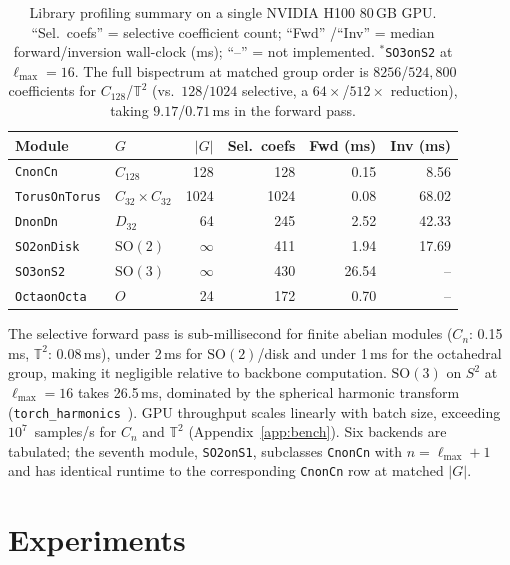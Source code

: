 \documentclass{article}
\theoremstyle{definition}
\theoremstyle{remark}
\newcommand{\SO}{\mathrm{SO}}
\theoremstyle{definition}
\begin{document}
\begin{table}[t]
  \centering
  \caption{Library profiling summary on a single NVIDIA H100 80\,GB GPU.
    ``Sel.\ coefs'' = selective coefficient count; ``Fwd'' /``Inv'' =
    median forward/inversion wall-clock (ms); ``--'' = not implemented.
    $^*$\texttt{SO3onS2} at $\ell_{\max}{=}16$. The full bispectrum at
    matched group order is $8256$/$524{,}800$ coefficients for
    $C_{128}$/$\mathbb{T}^2$ (vs.\ $128$/$1024$ selective, a
    $64\times$/$512\times$ reduction), taking $9.17$/$0.71$\,ms in
    the forward pass.}
  \label{tab:benchmarks}
  \small
  \setlength{\tabcolsep}{4pt}
  \begin{tabular}{llrrrr}
    \toprule
    Module & $G$ & $|G|$ & Sel.\ coefs & Fwd (ms) & Inv (ms) \\
    \midrule
    \texttt{CnonCn} & $C_{128}$ & 128 & 128 & 0.15 & 8.56 \\
    \texttt{TorusOnTorus} & $C_{32}{\times}C_{32}$ & 1024 & 1024 & 0.08 & 68.02 \\
    \texttt{DnonDn} & $D_{32}$ & 64 & 245 & 2.52 & 42.33 \\
    \texttt{SO2onDisk} & $\mathrm{SO}(2)$ & $\infty$ & 411 & 1.94 & 17.69 \\
    \texttt{SO3onS2}\rlap{$^*$} & $\mathrm{SO}(3)$ & $\infty$ & 430 & 26.54 & -- \\
    \texttt{OctaonOcta} & $O$ & 24 & 172 & 0.70 & -- \\
    \bottomrule
  \end{tabular}
\end{table}

The selective forward pass is sub-millisecond for finite abelian
modules ($C_n$: 0.15\,ms, $\mathbb{T}^2$: 0.08\,ms), under 2\,ms for
$\SO(2)$/disk and under 1\,ms for the octahedral group, making it
negligible relative to backbone computation. $\SO(3)$ on $S^2$ at
$\ell_{\max}{=}16$ takes 26.5\,ms, dominated by the spherical
harmonic transform
(\texttt{torch\_harmonics}~\citep{bonev2023spherical}). GPU throughput
scales linearly with batch size, exceeding $10^7$~samples/s for $C_n$
and $\mathbb{T}^2$ (Appendix~\ref{app:bench}). Six backends are
tabulated; the seventh module, \texttt{SO2onS1}, subclasses
\texttt{CnonCn} with $n = \ell_{\max}{+}1$ and has identical runtime
to the corresponding \texttt{CnonCn} row at matched $|G|$.

\section{Experiments}
\label{sec:experiments}
\end{document}
